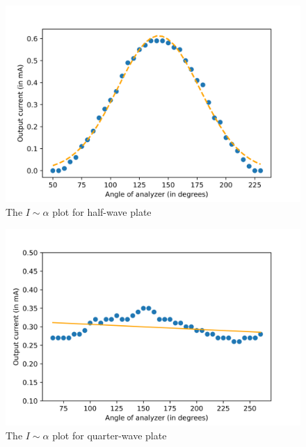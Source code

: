 \documentclass{article}
\begin{document}
\begin{figure}
    \centering
    \includegraphics[scale = 0.75]{Figures/plot-1.png}
    \caption{The $I \sim \alpha$ plot for half-wave plate}
    \label{fig:my_label}
\end{figure}

\begin{figure}
    \centering
    \includegraphics[scale = 0.75]{Figures/plot-2.png}
    \caption{The $I \sim \alpha$ plot for quarter-wave plate}
    \label{fig:my_label}
\end{figure}
\end{document}
